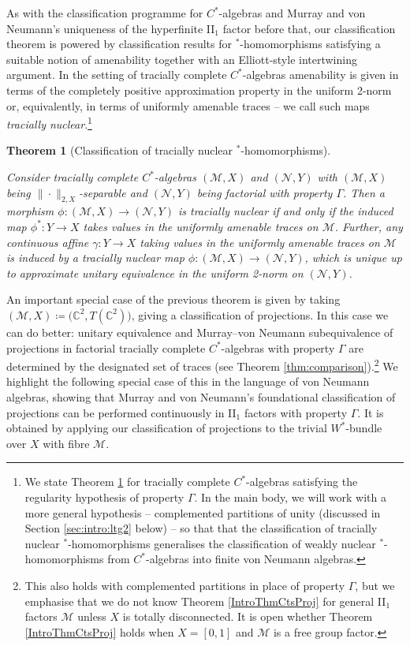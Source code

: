 \documentclass[a4paper,11pt]{amsart}
\newtheorem{theorem}{Theorem}
\theoremstyle{definition}
\numberwithin{equation}{section}
\numberwithin{theorem}{section}
\newcommand{\M}{\mathcal{M}}
\begin{document}
As with the classification programme for $C^*$-algebras and Murray and von Neumann's uniqueness of the hyperfinite II$_1$ factor before that, our classification theorem is powered by classification results for $^*$-homomorphisms satisfying a suitable notion of amenability together with an Elliott-style intertwining argument.  In the setting of tracially complete $C^*$-algebras amenability is given in terms of the completely positive approximation property in the uniform 2-norm or, equivalently, in terms of  uniformly amenable traces -- we call such maps \emph{tracially nuclear}.\footnote{We state Theorem \ref{IntroThmClassMap} for tracially complete $C^*$-algebras satisfying the regularity hypothesis of property $\Gamma$. In the main body, we will work with a more general hypothesis -- complemented partitions of unity (discussed in Section \ref{sec:intro:ltg2} below) -- so that that the classification of tracially nuclear $^*$-homomorphisms generalises the classification of weakly nuclear $^*$-homomorphisms from $C^*$-algebras into finite von Neumann algebras.}

\begin{theorem}[Classification of tracially nuclear $^*$-homomorphisms]\label{IntroThmClassMap}

Con\-si\-der tracially complete $C^*$-algebras $(\mathcal M, X)$ and $(\mathcal N, Y)$ with $(\mathcal M, X)$ being $\|\cdot\|_{2, X}$-separable and $(\mathcal N, Y)$ being factorial with property $\Gamma$.  Then a morphism $\phi \colon (\mathcal M, X) \rightarrow (\mathcal N, Y)$ is tracially nuclear if and only if the induced map $\phi^* \colon Y \to X$ takes values in the uniformly amenable traces on $\mathcal M$.  Further, any continuous affine $\gamma\colon Y\to X$ taking values in the uniformly amenable traces on $\mathcal M$ is induced by a tracially nuclear map $\phi\colon (\mathcal M,X)\to(\mathcal N,Y)$, which is unique up to approximate unitary equivalence in the uniform 2-norm on $(\mathcal N, Y)$.
\end{theorem}

An important special case of the previous theorem is given by taking $(\mathcal M, X)\coloneqq \big(\mathbb C^2, T(\mathbb C^2)\big)$, giving a classification of projections. In this case we can do better: unitary equivalence and Murray--von Neumann subequivalence of projections in factorial tracially complete $C^*$-algebras with property $\Gamma$ are determined by the designated set of traces (see Theorem \ref{thm:comparison}).\footnote{This also holds with complemented partitions in place of property $\Gamma$, but we emphasise that we do not know Theorem \ref{IntroThmCtsProj} for general II$_1$ factors $\M$ unless $X$ is totally disconnected. It is open whether Theorem \ref{IntroThmCtsProj} holds when $X= [0,1]$ and $\M$ is a free group factor.}  We highlight the following special case of this in the language of von Neumann algebras, showing that Murray and von Neumann's foundational classification of projections can be performed continuously in II$_1$ factors with property $\Gamma$.  It is obtained by applying our classification of projections to the trivial $W^*$-bundle over $X$ with fibre $\M$.
\end{document}
